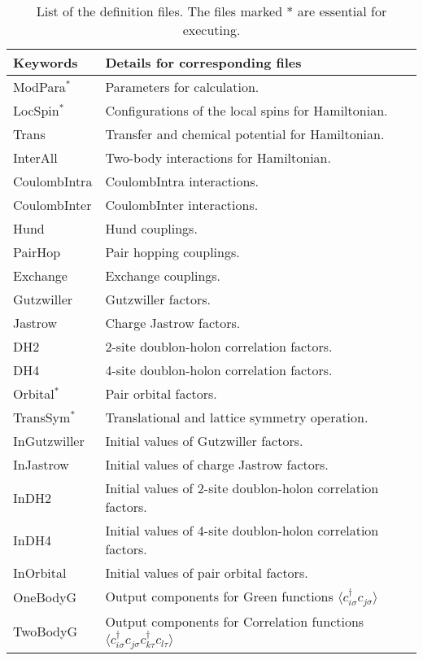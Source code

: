  \begin{table*}[h!]
\begin{center}
  \begin{tabular}{|ll|} \hline
           Keywords     & Details for corresponding files       \\   \hline\hline
           ModPara$^*$        &  Parameters for calculation.        \\ \hline 
           LocSpin$^*$          &  Configurations of the local spins for Hamiltonian.         \\ 
           Trans       &   Transfer and chemical potential for Hamiltonian.  \\
           InterAll  &   Two-body interactions for Hamiltonian. \\  
           CoulombIntra  &   CoulombIntra interactions. \\  
           CoulombInter  &   CoulombInter  interactions. \\  
           Hund  &   Hund couplings. \\  
           PairHop  &  Pair hopping couplings. \\  
           Exchange  &  Exchange couplings. \\  \hline
           Gutzwiller & Gutzwiller factors.\\
           Jastrow & Charge Jastrow factors.\\
           DH2 & 2-site doublon-holon correlation factors.\\
           DH4 & 4-site doublon-holon correlation factors.\\
           Orbital$^*$  & Pair orbital factors.\\
           TransSym$^*$  & Translational and lattice symmetry operation. \\ \hline
           InGutzwiller & Initial values of Gutzwiller factors.\\
           InJastrow & Initial values of charge Jastrow factors.\\
           InDH2 & Initial values of 2-site doublon-holon correlation factors.\\
           InDH4 & Initial values of 4-site doublon-holon correlation factors.\\
           InOrbital & Initial values of pair orbital factors.\\ \hline
           OneBodyG         &   Output components for Green functions $\langle c_{i\sigma}^{\dagger}c_{j\sigma}\rangle$           \\   
           TwoBodyG &   Output components for Correlation functions $\langle c_{i\sigma}^{\dagger}c_{j\sigma}c_{k\tau}^{\dagger}c_{l\tau}\rangle$  \\   \hline
  \end{tabular}
\end{center}
\caption{List of the definition files. The files marked * are essential for executing.}
\label{Table:Defs}
\end{table*}%


